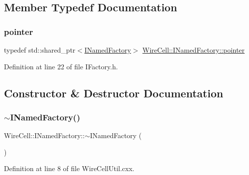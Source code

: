 \subsection{Member Typedef Documentation}
\mbox{\label{class_wire_cell_1_1_i_named_factory_a76fa5c86b2a5f65a74952f8bec4941d2}} 
\subsubsection{\texorpdfstring{pointer}{pointer}}
{\footnotesize\ttfamily typedef std\+::shared\+\_\+ptr$<$\hyperlink{class_wire_cell_1_1_i_named_factory}{I\+Named\+Factory}$>$ \hyperlink{class_wire_cell_1_1_i_named_factory_a76fa5c86b2a5f65a74952f8bec4941d2}{Wire\+Cell\+::\+I\+Named\+Factory\+::pointer}}



Definition at line 22 of file I\+Factory.\+h.



\subsection{Constructor \& Destructor Documentation}
\mbox{\label{class_wire_cell_1_1_i_named_factory_aae114af54abe808635cd2f29f1bbddbb}} 
\subsubsection{\texorpdfstring{$\sim$\+I\+Named\+Factory()}{~INamedFactory()}}
{\footnotesize\ttfamily Wire\+Cell\+::\+I\+Named\+Factory\+::$\sim$\+I\+Named\+Factory (\begin{DoxyParamCaption}{ }\end{DoxyParamCaption})\hspace{0.3cm}{\ttfamily [virtual]}}



Definition at line 8 of file Wire\+Cell\+Util.\+cxx.



